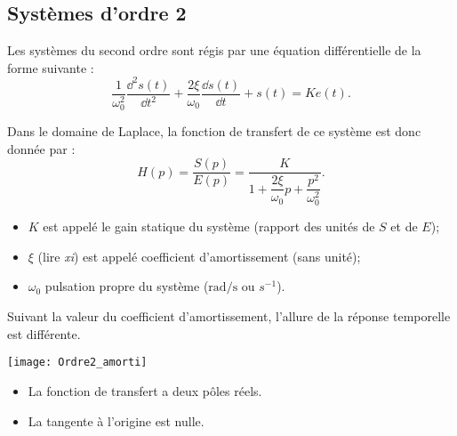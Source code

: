 \subsection{Systèmes d'ordre 2}

\begin{marginfigure}[1cm]
\centering
{}
\end{marginfigure}

\begin{defi}
Les systèmes du second ordre sont régis par une équation différentielle de la
forme suivante :
$$
\dfrac{1}{\omega_0^2} \dfrac{\dd^2 s(t)}{\dd t^2}+\dfrac{2\xi}{\omega_0} \dfrac{\dd s(t)}{\dd t}+s(t) = Ke(t).
$$

Dans le domaine de Laplace, la fonction de transfert de ce système est donc
donnée par :
$$ H(p)=\dfrac{S(p)}{E(p)} = \dfrac{K}{1+ \dfrac{2\xi}{\omega_0}p+\dfrac{p^2}{\omega_0^2}}. $$

\end{defi}

\begin{itemize}
\item $K$ est appelé le gain statique du système (rapport des unités de $S$ et de $E$);
\item $\xi$ (lire \textit{xi}) est appelé coefficient d'amortissement (sans unité);
\item $\omega_0$ pulsation propre du système ($\text{rad/s}$ ou $s^{-1}$).
\end{itemize}

Suivant la valeur du coefficient d'amortissement, l'allure de la réponse temporelle est différente.





\begin{marginfigure}
\texttt{[image: Ordre2\_amorti]}
\end{marginfigure}

\begin{resultat}
\begin{itemize} 
\item La fonction de transfert a deux pôles réels.
\item La tangente à l'origine est nulle.
\end{itemize}
\end{resultat}



